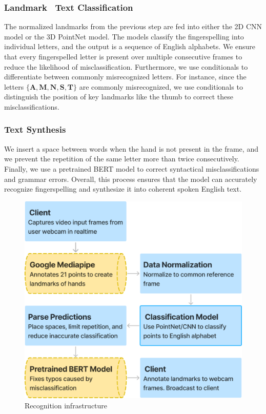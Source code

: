 \documentclass[../paper.tex]{subfiles}
\begin{document}
\subsubsection*{Landmark \textrightarrow\ Text Classification}
The normalized landmarks from the previous step are fed into either the 2D CNN model or the 3D PointNet model. The models classify the fingerspelling into individual letters, and the output is a sequence of English alphabets. We ensure that every fingerspelled letter is present over multiple consecutive frames to reduce the likelihood of misclassification. Furthermore, we use conditionals to differentiate between commonly misrecognized letters. For instance, since the letters $\mathbf{\{A, M, N, S, T\}}$ are commonly misrecognized, we use conditionals to distinguish the position of key landmarks like the thumb to correct these misclassifications.
\subsubsection*{Text Synthesis}
We insert a space between words when the hand is not present in the frame, and we prevent the repetition of the same letter more than twice consecutively. Finally, we use a pretrained BERT model to correct syntactical misclassifications and grammar errors. Overall, this process ensures that the model can accurately recognize fingerspelling and synthesize it into coherent spoken English text.

\begin{figure}[!htbp]
  \centerline{\includegraphics[width=\linewidth]{../figures/recognition-flow.png}}
  \caption{Recognition infrastructure}\label{fig:recognition_flow}
\end{figure}
\end{document}
